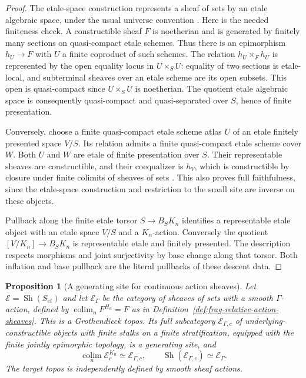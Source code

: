 \documentclass[11pt]{article}
\newtheorem{proposition}[theorem]{Proposition}
\theoremstyle{definition}
\theoremstyle{remark}
\begin{document}
\begin{proof}
The etale-space construction represents a sheaf of sets by an etale
algebraic space, under the usual universe convention
\cite{StacksEtaleSpaceRealization}.  Here is the needed finiteness check.
A constructible sheaf $F$ is noetherian and is generated by finitely
many sections on quasi-compact etale schemes.  Thus there is an
epimorphism $h_U\to F$ with $U$ a finite coproduct of such schemes.
The relation $h_U\times_F h_U$ is represented by the open equality
locus in $U\times_SU$: equality of two sections is etale-local, and
subterminal sheaves over an etale scheme are its open subsets.
This open is quasi-compact since $U\times_SU$ is noetherian.  The
quotient etale algebraic space is consequently quasi-compact and
quasi-separated over $S$, hence of finite presentation.

Conversely, choose a finite quasi-compact etale scheme atlas $U$ of
an etale finitely presented space $V/S$.  Its relation admits a
finite quasi-compact etale scheme cover $W$.  Both $U$ and $W$ are
etale of finite presentation over $S$.  Their representable sheaves
are constructible, and their coequalizer is $h_V$, which is
constructible by closure under finite colimits of sheaves of sets
\cite[Section 59.73]{StacksConstructibleNoetherian}.  This also proves
full faithfulness, since the etale-space construction and restriction
to the small site are inverse on these objects.

Pullback along the finite etale torsor $S\to B_SK_n$ identifies a
representable etale object with an etale space $V/S$ and a $K_n$-action.
Conversely the quotient $[V/K_n]\to B_SK_n$ is representable etale
and finitely presented.  The description respects morphisms and
joint surjectivity by base change along that torsor.  Both inflation
and base pullback are the literal pullbacks of these descent data.
\end{proof}

\begin{proposition}[A generating site for continuous action sheaves]
\label{prop:frag-continuous-action-generators}
Let $\mathscr E=\operatorname{Sh}(S_{\acute et})$ and let
$\mathscr E_\Gamma$ be the category of sheaves of sets with a smooth
$\Gamma$-action, defined by $\operatorname*{colim}_n F^{H_n}=F$ as
in Definition~\ref{def:frag-relative-action-sheaves}.
This is a Grothendieck topos.  Its full subcategory
$\mathscr E_{\Gamma,c}$ of underlying-constructible objects with finite
stalks on a finite stratification, equipped
with the finite jointly epimorphic topology, is a generating site, and
\[
\operatorname*{colim}_n\mathscr E_c^{K_n}
 \simeq\mathscr E_{\Gamma,c},
\qquad
\operatorname{Sh}(\mathscr E_{\Gamma,c})\simeq\mathscr E_\Gamma.
\]
The target topos is independently defined by smooth sheaf actions.
\end{proposition}
\end{document}
